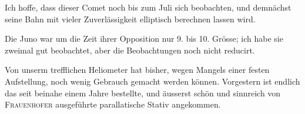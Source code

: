 \par\indent Ich hoffe, dass dieser Comet noch bis zum Juli sich beobachten, und demnächst seine Bahn mit
vieler Zuverlässigkeit elliptisch berechnen lassen wird.

\par\indent Die Juno war um die Zeit ihrer Opposition nur 9. bis 10. Grösse; ich habe sie zweimal gut
beobachtet, aber die Beobachtungen noch nicht reducirt.

\par\indent Von unserm trefflichen Heliometer hat bisher, wegen Mangels einer festen Aufstellung, noch
wenig Gebrauch gemacht werden können. Vorgestern ist endlich das seit beinahe einem Jahre
bestellte, und äusserst schön und sinnreich von \textsc{Frauenhofer} ausgeführte parallatische Stativ
angekommen.
